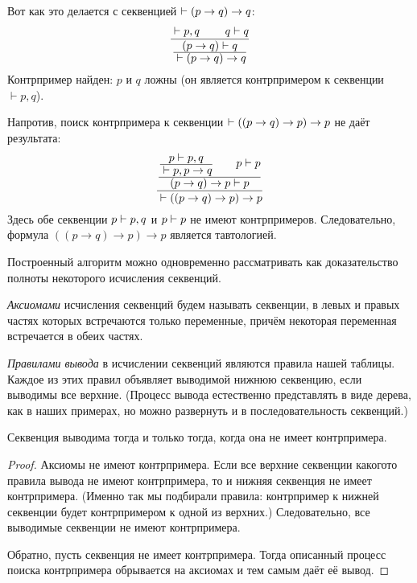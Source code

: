 Вот как это делается с секвенцией ${\vdash(p\to q)}\hm\to q$:
        $$
\frac{\mathstrut\vdash p,q\;\qquad q\vdash q}
{\frac{\displaystyle \mathstrut(p\to q)\vdash q}
{\displaystyle \mathstrut\vdash (p\to q)\to q}}
         $$
Контрпример найден: $p$ и $q$ ложны (он является контрпримером к
секвенции $\vdash p,q$).

Напротив,
поиск контрпримера к секвенции
${\vdash((p\to q)\to p)}\hm\to p$
не даёт результата:
       $$
\frac{\frac{%
\frac{\displaystyle \mathstrut p\vdash p,q}
     {\displaystyle \mathstrut\vdash p,p\to q}\qquad
\displaystyle
     \mathstrut p\vdash p}%
{\displaystyle \mathstrut (p\to q)\to p\vdash p}}%
{\mathstrut\vdash((p\to q)\to p)\to p}
        $$
Здесь обе секвенции $p\hm\vdash p,q$ и $p\hm\vdash p$ не имеют
контрпримеров. Следовательно, формула $((p\to q)\to p)\to p$
является тавтологией.

Построенный алгоритм можно одновременно рассматривать
как доказательство полноты некоторого  исчисления
секвенций.

\emph{Аксиомами}%
%
исчисления секвенций будем называть секвенции,
в левых и правых частях которых встречаются только переменные,
причём некоторая переменная встречается в обеих частях.

\emph{Правилами вывода}%
%
в исчислении секвенций являются правила
нашей таблицы. Каждое из этих правил объявляет выводимой нижнюю
секвенцию, если выводимы все верхние. (Процесс вывода
естественно представлять в виде дерева, как в наших примерах, но
можно развернуть и в последовательность секвенций.)

\begin{theorem}
%
Секвенция выводима тогда и только тогда, когда
она не имеет контрпримера.
\end{theorem}

\begin{proof}
Аксиомы не имеют контрпримера. Если все верхние секвенции какого\д то
правила вывода не имеют контрпримера, то и нижняя секвенция не
имеет контрпримера. (Именно так мы подбирали правила: контрпример
к нижней секвенции будет контрпримером к одной из верхних.)
Следовательно, все выводимые секвенции не имеют контрпримера.

Обратно, пусть секвенция не имеет контрпримера. Тогда
описанный процесс поиска контрпримера обрывается на
аксиомах и тем самым даёт её вывод.
\end{proof}

